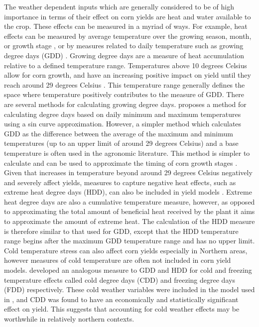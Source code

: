 The weather dependent inputs which are generally considered to be of high importance in terms of their effect on corn yields are heat and water available to the crop. These effects can be measured in a myriad of ways. For example, heat effects can be measured by average temperature over the growing season, month, or growth stage \citep{ozkan2002impacts}, or by measures related to daily temperature such as growing degree days (GDD) \citep{swan1990corn}. Growing degree days are a measure of heat accumulation relative to a defined temperature range. Temperatures above 10 degrees Celsius allow for corn growth, and have an increasing positive impact on yield until they reach around 29 degrees Celsius \citep{neild1987growing}. This temperature range generally defines the space where temperature positively contributes to the measure of GDD. There are several methods for calculating growing degree days. \cite{snyder1985hand} proposes a method for calculating degree days based on daily minimum and maximum temperatures using a sin curve approximation. However, a simpler method which calculates GDD as the difference between the average of the maximum and minimum temperatures (up to an upper limit of around 29 degrees Celsius) and a base temperature is often used in the agronomic literature. This method is simpler to calculate and can be used to approximate the timing of corn growth stages \citep{neild1987growing}. Given that increases in temperature beyond around 29 degrees Celsius negatively and severely affect yields, measures to capture negative heat effects, such as extreme heat degree days (HDD), can also be included in yield models \citep{roberts2012agronomic}. Extreme heat degree days are also a cumulative temperature measure, however, as opposed to approximating the total amount of beneficial heat received by the plant it aims to approximate the amount of extreme heat.  The calculation of the HDD measure is therefore similar to that used for GDD, except that the HDD temperature range begins after the maximum GDD temperature range and has no upper limit.  Cold temperature stress can also affect corn yields especially in Northern areas, however measures of cold temperature are often not included in corn yield models. \cite{tolhurst2015cold} developed an analogous measure to GDD and HDD for cold and freezing temperature effects called cold degree days (CDD) and freezing degree days (FDD) respectively. These cold weather variables were included in the model used in \cite{tolhurst2015cold}, and CDD was found to have an economically and statistically significant effect on yield. This suggests that accounting for cold weather effects may be worthwhile in relatively northern contexts.

